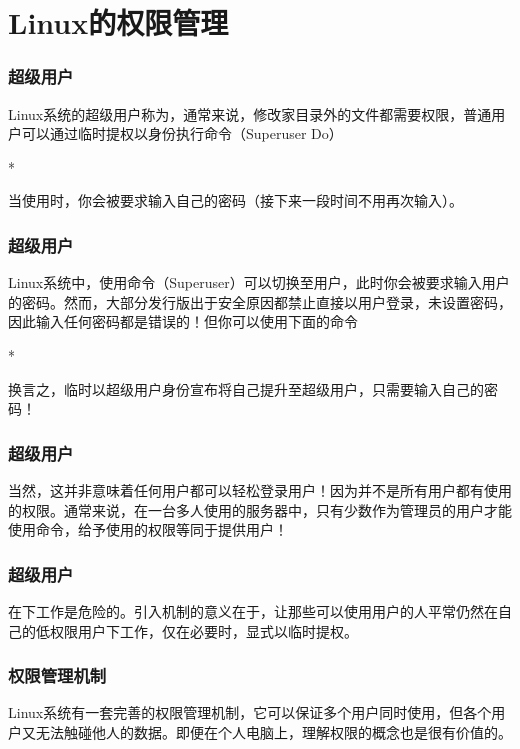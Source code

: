 \section{Linux的权限管理}

\begin{frame}
    \frametitle{超级用户}
    Linux系统的超级用户称为，通常来说，修改家目录外的文件都需要权限，普通用户可以通过临时提权以身份执行命令（Superuser Do）
    \begin{Code}*
        
    \end{Code}
    当使用时，你会被要求输入自己的密码（接下来一段时间不用再次输入）。
\end{frame}

\begin{frame}
    \frametitle{超级用户}
    Linux系统中，使用命令（Superuser）可以切换至用户，此时你会被要求输入用户的密码。然而，大部分发行版出于安全原因都禁止直接以用户登录，未设置密码，因此输入任何密码都是错误的！但你可以使用下面的命令
    \begin{Code}*
        
    \end{Code}
    换言之，临时以超级用户身份宣布将自己提升至超级用户，只需要输入自己的密码！
\end{frame}

\begin{frame}
    \frametitle{超级用户}
    当然，这并非意味着任何用户都可以轻松登录用户！因为并不是所有用户都有使用的权限。通常来说，在一台多人使用的服务器中，只有少数作为管理员的用户才能使用命令，给予使用的权限等同于提供用户！
\end{frame}

\begin{frame}
    \frametitle{超级用户}
    在下工作是危险的。引入机制的意义在于，让那些可以使用用户的人平常仍然在自己的低权限用户下工作，仅在必要时，显式以临时提权。
\end{frame}

\begin{frame}
    \frametitle{权限管理机制}
    Linux系统有一套完善的权限管理机制，它可以保证多个用户同时使用，但各个用户又无法触碰他人的数据。即便在个人电脑上，理解权限的概念也是很有价值的。
\end{frame}

